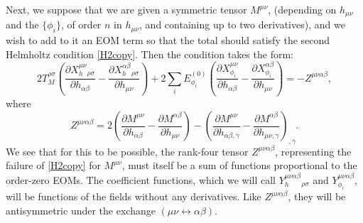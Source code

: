 \documentclass[aps,physrev,preprint,groupedaddress]{revtex4-2}
\begin{document}
Next, we suppose that we are given a symmetric tensor \(M^{\mu\nu}\), (depending on \(h_{\mu\nu}\) and the \(\{\phi_i\}\), of order \(n\) in \(h_{\mu\nu}\), and containing up to two derivatives), and we wish to add to it an EOM term so that the total should satisfy the second Helmholtz condition \eqref{H2copy}. Then the condition takes the form:
\begin{equation}
2T^{\rho\sigma}_M\left(\frac{\partial X_h^{\mu\nu}{}_{\rho\sigma}}{\partial h_{\alpha\beta}}-\frac{\partial X_h^{\alpha\beta}{}_{\rho\sigma}}{\partial h_{\mu\nu}}\right)+2\sum_iE_{\phi_i}^{(0)}\left(\frac{\partial X_{\phi_i}^{\mu\nu}}{\partial h_{\alpha\beta}}-\frac{\partial X_{\phi_i}^{\alpha\beta}}{\partial h_{\mu\nu}}\right)=-Z^{\mu\nu\alpha\beta},
\end{equation}
where
\begin{equation}
    Z^{\mu\nu\alpha\beta}=2\left(\frac{\partial M^{\mu\nu}}{\partial h_{\alpha\beta}}-\frac{\partial M^{\alpha\beta}}{\partial h_{\mu\nu}}\right)-{\left(\frac{\partial M^{\mu\nu}}{\partial h_{\alpha\beta,\gamma}}-\frac{\partial M^{\alpha\beta}}{\partial h_{\mu\nu,\gamma}}\right)}_{,\gamma}.
\end{equation}
We see that for this to be possible, the rank-four tensor \(Z^{\mu\nu\alpha\beta}\), representing the failure of \eqref{H2copy} for \(M^{\mu\nu}\), must itself be a sum of functions proportional to the order-zero EOMs. The coefficient functions, which we will call \(Y_h^{\mu\nu\alpha\beta}{}_{\rho\sigma}\) and \(Y_{\phi_i}^{\mu\nu\alpha\beta}\), will be functions of the fields without any derivatives. Like \(Z^{\mu\nu\alpha\beta}\), they will be antisymmetric under the exchange \((\mu\nu\leftrightarrow\alpha\beta)\).
\end{document}
